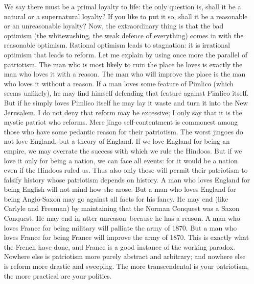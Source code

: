\documentclass{book}
\begin{document}
We say there must be a primal loyalty to life: the only question is, shall it be a natural or a supernatural loyalty? If you like to put it so, shall it be a reasonable or an unreasonable loyalty? Now, the extraordinary thing is that the bad optimism (the whitewashing, the weak defence of everything) comes in with the reasonable optimism. Rational optimism leads to stagnation: it is irrational optimism that leads to reform. Let me explain by using once more the parallel of patriotism. The man who is most likely to ruin the place he loves is exactly the man who loves it with a reason. The man who will improve the place is the man who loves it without a reason. If a man loves some feature of Pimlico (which seems unlikely), he may find himself defending that feature against Pimlico itself. But if he simply loves Pimlico itself he may lay it waste and turn it into the New Jerusalem. I do not deny that reform may be excessive; I only say that it is the mystic patriot who reforms. Mere jingo self-contentment is commonest among those who have some pedantic reason for their patriotism. The worst jingoes do not love England, but a theory of England. If we love England for being an empire, we may overrate the success with which we rule the Hindoos. But if we love it only for being a nation, we can face all events: for it would be a nation even if the Hindoos ruled us. Thus also only those will permit their patriotism to falsify history whose patriotism depends on history. A man who loves England for being English will not mind how she arose. But a man who loves England for being Anglo-Saxon may go against all facts for his fancy. He may end (like Carlyle and Freeman) by maintaining that the Norman Conquest was a Saxon Conquest. He may end in utter unreason–because he has a reason. A man who loves France for being military will palliate the army of 1870. But a man who loves France for being France will improve the army of 1870. This is exactly what the French have done, and France is a good instance of the working paradox. Nowhere else is patriotism more purely abstract and arbitrary; and nowhere else is reform more drastic and sweeping. The more transcendental is your patriotism, the more practical are your politics.
\end{document}
